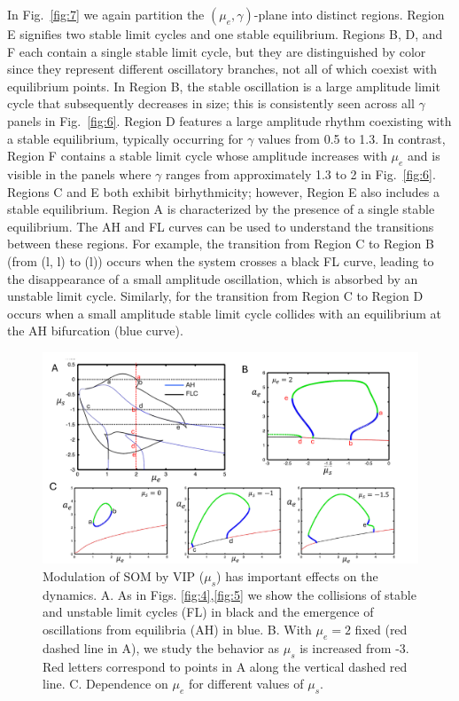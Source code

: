 \documentclass[10pt,letterpaper]{article}
\begin{document}
In  Fig.~\ref{fig:7} we again partition the $(\mu_e, \gamma)$-plane into distinct regions. Region E signifies two stable limit cycles and one stable equilibrium. Regions B, D, and F each contain a single stable limit cycle, but they are distinguished by color since they represent different oscillatory branches, not all of which coexist with equilibrium points. In Region B, the stable oscillation is a large amplitude limit cycle that subsequently decreases in size; this is consistently seen across all $\gamma$ panels in Fig.~\ref{fig:6}. Region D features a large amplitude rhythm coexisting with a stable equilibrium, typically occurring for $\gamma$ values from 0.5 to 1.3. In contrast, Region F contains a stable limit cycle whose amplitude increases with $\mu_e$ and is visible in the panels where $\gamma$ ranges from approximately 1.3 to 2 in Fig.~\ref{fig:6}. Regions C and E both exhibit birhythmicity; however, Region E also includes a stable equilibrium. Region A is characterized by the presence of a single stable equilibrium.  The AH and FL curves can be used to understand the transitions between these regions. For example, the transition from Region C to Region B (from (l, l) to (l)) occurs when the system crosses a black FL curve, leading to the disappearance of a small amplitude oscillation, which is absorbed by an unstable limit cycle. Similarly, for the transition from Region C to Region D occurs when a small amplitude stable limit cycle collides with an equilibrium at the AH bifurcation (blue curve).  











\begin{figure}
\includegraphics[width=.9\textwidth]{afig9.pdf}
\caption{Modulation of SOM by VIP ($\mu_s$) has important effects on the dynamics.  A. As in Figs. \ref{fig:4},\ref{fig:5} we show the collisions of stable and unstable limit cycles (FL) in black and the emergence of oscillations from equilibria (AH) in blue. B. With $\mu_e=2$ fixed (red dashed line in A), we study the behavior as $\mu_s$ is increased from -3. Red letters correspond  to points in A along the vertical dashed red line. C. Dependence on $\mu_e$ for different values of $\mu_s$.    }
\label{fig:8}
\end{figure}
\end{document}
